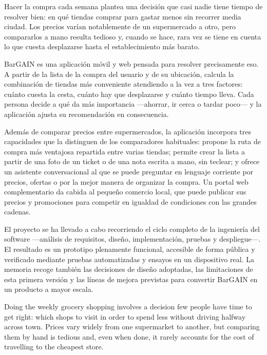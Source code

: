 
Hacer la compra cada semana plantea una decisi\'on que casi nadie tiene tiempo de resolver bien:
en qu\'e tiendas comprar para gastar menos sin recorrer media ciudad. Los precios var\'ian
notablemente de un supermercado a otro, pero compararlos a mano resulta tedioso y, cuando se hace,
rara vez se tiene en cuenta lo que cuesta desplazarse hasta el establecimiento m\'as barato.

BarGAIN es una aplicaci\'on m\'ovil y web pensada para resolver precisamente eso. A partir de la
lista de la compra del usuario y de su ubicaci\'on, calcula la combinaci\'on de tiendas m\'as
conveniente atendiendo a la vez a tres factores: cu\'anto cuesta la cesta, cu\'anto hay que
desplazarse y cu\'anto tiempo lleva. Cada persona decide a qu\'e da m\'as importancia ---ahorrar,
ir cerca o tardar poco--- y la aplicaci\'on ajusta su recomendaci\'on en consecuencia.

Adem\'as de comparar precios entre supermercados, la aplicaci\'on incorpora tres capacidades que
la distinguen de los comparadores habituales: propone la ruta de compra m\'as ventajosa repartida
entre varias tiendas; permite crear la lista a partir de una foto de un ticket o de una nota
escrita a mano, sin teclear; y ofrece un asistente conversacional al que se puede preguntar en
lenguaje corriente por precios, ofertas o por la mejor manera de organizar la compra. Un portal
web complementario da cabida al peque\~no comercio local, que puede publicar sus precios y
promociones para competir en igualdad de condiciones con las grandes cadenas.

El proyecto se ha llevado a cabo recorriendo el ciclo completo de la ingenier\'ia del software
---an\'alisis de requisitos, dise\~no, implementaci\'on, pruebas y despliegue---. El resultado es
un prototipo plenamente funcional, accesible de forma p\'ublica y verificado mediante pruebas
automatizadas y ensayos en un dispositivo real. La memoria recoge tambi\'en las decisiones de
dise\~no adoptadas, las limitaciones de esta primera versi\'on y las l\'ineas de mejora previstas
para convertir BarGAIN en un producto a mayor escala.


Doing the weekly grocery shopping involves a decision few people have time to get right: which
shops to visit in order to spend less without driving halfway across town. Prices vary widely from
one supermarket to another, but comparing them by hand is tedious and, even when done, it rarely
accounts for the cost of travelling to the cheapest store.

